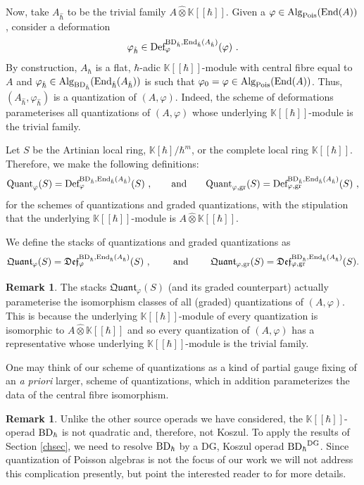 \documentclass[11pt]{amsart}
\numberwithin{equation}{section}
\theoremstyle{definition}
\newtheorem{rmk}[theo]{Remark}
\newcommand{\bb}{\mathbb}
\newcommand{\Def}{{\textup{Def}}}
\newcommand{\fDef}{{\mathfrak{Def}}}
\newcommand{\OEnd}{{\textup{End}}}
\newcommand{\fph}{{[\![\hbar]\!]}}
\newcommand{\gd}{{\textup{gr}}}
\newcommand{\ik}{{\bb K}}
\newcommand{\End}{{\textup{End}}}
\newcommand{\BDh}{{\textup{BD}_\hbar}}
\newcommand{\BDhat}{{\textup{BD}_{\hat{\hbar}}}}
\newcommand{\Quant}{{\textup{Quant}}}
\newcommand{\fQuant}{{\mathfrak{Quant}}}
\newcommand{\Alg}{{\textup{Alg}}}
\newcommand{\Pois}{{\textup{Pois}}}
\newcommand{\0}{{\textbf{0}}}
\newcommand{\DG}{{\textup{DG}}}
\def \vph{\varphi_{\hat \hbar}}
\def \hhb{{\hat \hbar}}
\begin{document}
Now, take $A_{\hat \hbar}$ to be the trivial family $A\widehat{\otimes}\ik\fph$. Given a $\varphi\in \Alg_{\Pois}(\End(A))$, consider a deformation 
\[
\vph\in \Def_{\varphi}^{\BDhat,\OEnd_\hhb(A_\hhb)}(\varphi)~.
\]
By construction, $A_\hbar$ is a flat, $\hbar$-adic $\ik\fph$-module with central fibre equal to $A$ and $\vph\in \Alg_{\BDhat}(\OEnd_\hhb(A_\hhb))$ is such that $\varphi_0 = \varphi\in \Alg_{\Pois}(\OEnd(A))$. Thus, $(A_\hhb,\vph)$ is a quantization of $(A,\varphi)$. Indeed, the scheme of deformations parameterises all quantizations of $(A,\varphi)$ whose underlying $\ik\fph$-module is the trivial family.


Let $S$ be the Artinian local ring, $ \ik[\hbar]/\hbar^m$, or the complete local ring $\ik\fph$.
Therefore, we make the following definitions:
\begin{equation}
\Quant_\varphi(S)  =\Def_\varphi^{\BDhat,\OEnd_{\hat \hbar}(A_{\hat\hbar})}(S)~,\qquad \text{and} \qquad    \Quant_{\varphi,\gd}(S)  =\Def_{\varphi,\gd}^{\BDhat,\OEnd_{\hat \hbar}(A_{\hat\hbar})}(S)~,
\end{equation}
for the schemes of quantizations and graded quantizations, with the stipulation that the underlying $\ik\fph$-module is $A\widehat{\otimes}\ik\fph$.

We define the stacks of quantizations and graded quantizations as 
\begin{equation}
	\fQuant_\varphi(S)  =\fDef_\varphi^{\BDhat,\OEnd_{\hat \hbar}(A_{\hat\hbar})}(S)    ~,\qquad \text{ and } \qquad \fQuant_{\varphi,\gd}(S)  =\fDef_{\varphi,\gd}^{\BDhat,\OEnd_{\hat \hbar}(A_{\hat\hbar})}(S)   .
\end{equation}

\begin{rmk}\label{rmk:stack of finite quant is good}
The stacks $\fQuant_\varphi(S)$ (and its graded counterpart) actually parameterise the isomorphism classes of all (graded) quantizations of $(A,\varphi)$. This is because the underlying $\ik\fph$-module of every quantization is isomorphic to $A\widehat{\otimes} \ik\fph$ and so every quantization of $(A,\varphi)$ has a representative whose underlying $\ik\fph$-module is the trivial family.

One may think of our scheme of quantizations as a kind of partial gauge fixing of an \textit{a priori} larger, scheme of quantizations, which in addition parameterizes the data of the central fibre isomorphism.
\end{rmk}


\begin{rmk}
	Unlike the other source operads we have considered, the $\ik\fph$-operad $\BDh$ is not quadratic and, therefore, not Koszul. To apply the results of Section \ref{chsec}, we need to resolve $\BDh$ by a DG, Koszul operad $\BDh^{\DG}$. Since quantization of Poisson algebras is not the focus of our work we will not address this complication presently, but point the interested reader to \cite{Melani2018,CosGw} for more details.
\end{rmk}
\end{document}
